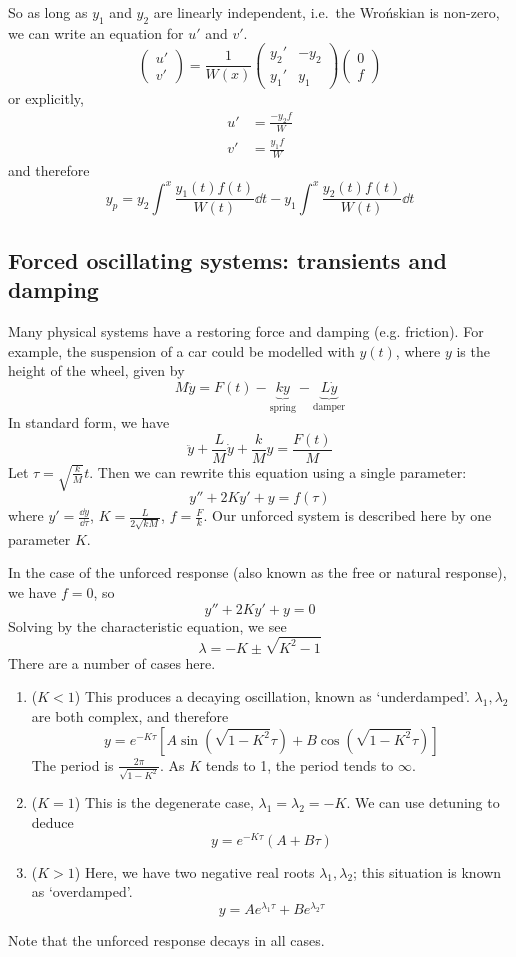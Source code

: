 So as long as \(y_1\) and \(y_2\) are linearly independent, i.e.\ the Wro\'nskian is non-zero, we can write an equation for \(u'\) and \(v'\).
\[
	\begin{pmatrix}
		u' \\ v'
	\end{pmatrix} = \frac{1}{W(x)}\begin{pmatrix}
		y_2' & -y_2 \\ y_1' & y_1
	\end{pmatrix} \begin{pmatrix}
		0 \\ f
	\end{pmatrix}
\]
or explicitly,
\begin{align*}
	u' & = \frac{-y_2 f}{W} \\
	v' & = \frac{y_1 f}{W}
\end{align*}
and therefore
\[
	y_p = y_2 \int^x \frac{y_1(t) f(t)}{W(t)}\dd{t} - y_1 \int^x \frac{y_2(t) f(t)}{W(t)}\dd{t}
\]

\subsection{Forced oscillating systems: transients and damping}
Many physical systems have a restoring force and damping (e.g.
friction).
For example, the suspension of a car could be modelled with \(y(t)\), where \(y\) is the height of the wheel, given by
\[
	M\ddot y = F(t) - \underbrace{ky}_{\text{spring}} - \underbrace{L\dot y}_{\text{damper}}
\]
In standard form, we have
\[
	\ddot y + \frac{L}{M} \dot y + \frac{k}{M} y = \frac{F(t)}{M}
\]
Let \(\tau = \sqrt{\frac{k}{M}} t\).
Then we can rewrite this equation using a single parameter:
\[
	y'' + 2Ky' + y = f(\tau)
\]
where \(y' = \frac{\dd{y}}{\dd \tau}\), \(K = \frac{L}{2\sqrt{kM}}\), \(f = \frac{F}{k}\).
Our unforced system is described here by one parameter \(K\).

In the case of the unforced response (also known as the free or natural response), we have \(f=0\), so
\[
	y'' + 2Ky' + y = 0
\]
Solving by the characteristic equation, we see
\[
	\lambda = -K \pm \sqrt{K^2 - 1}
\]
There are a number of cases here.
\begin{enumerate}
	\item (\(K < 1\)) This produces a decaying oscillation, known as `underdamped'.
	      \(\lambda_1, \lambda_2\) are both complex, and therefore
	      \[
		      y = e^{-K\tau}\left[A\sin(\sqrt{1-K^2}\tau) + B\cos(\sqrt{1-K^2}\tau)\right]
	      \]
	      The period is \(\frac{2\pi}{\sqrt{1-K^2}}\).
	      As \(K\) tends to 1, the period tends to \(\infty\).
	\item (\(K = 1\)) This is the degenerate case, \(\lambda_1 = \lambda_2 = -K\).
	      We can use detuning to deduce
	      \[
		      y = e^{-K\tau} (A + B\tau)
	      \]
	\item (\(K > 1\)) Here, we have two negative real roots \(\lambda_1, \lambda_2\); this situation is known as `overdamped'.
	      \[
		      y = Ae^{\lambda_1 \tau} + Be^{\lambda_2 \tau}
	      \]
\end{enumerate}
Note that the unforced response decays in all cases.
